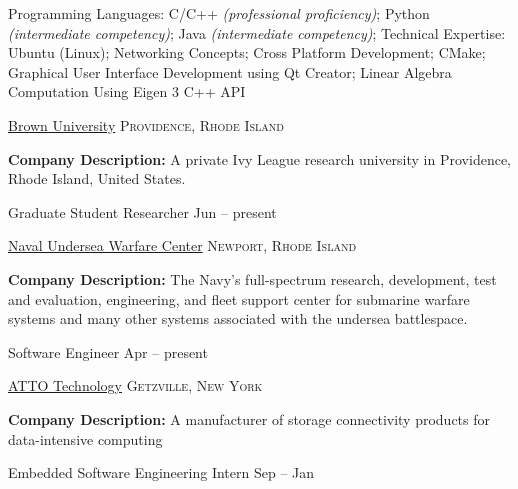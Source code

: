 \documentclass[12pt,a3paper]{article}
\begin{document}
\spacedhrule{0.5em}{-0.4em}


\inlineheadsection
  {Programming Languages:}
  { C/C++  \emph{(professional proficiency)}; Python  \emph{(intermediate competency)}; Java \emph{(intermediate competency)};}
\inlineheadsection
  {Technical Expertise:}
  {Ubuntu (Linux); Networking Concepts; Cross Platform Development; CMake; Graphical User Interface Development using Qt Creator; Linear Algebra Computation Using Eigen 3 C++ API}

\spacedhrule{1.6em}{-0.4em}


\headedsection  %
  {\href{http://robotics.cs.brown.edu/}{Brown University}}
  {\textsc{Providence, Rhode Island}} {
  
  {\textbf{Company Description:} A private Ivy League research university in Providence, Rhode Island, United States.}
  
  \headedsubsection
    {Graduate Student Researcher}
    {Jun  -- present}
    {}
}

\headedsection  %
  {\href{http://www.navsea.navy.mil/Home/Warfare-Centers/NUWC-Newport/}{Naval Undersea Warfare Center}}
  {\textsc{Newport, Rhode Island}} { 
  
  {\textbf{Company Description:} The Navy's full-spectrum research, development, test and evaluation, engineering, and fleet support center for submarine warfare systems and many other systems associated with the undersea battlespace.}
  
  \headedsubsection
    {Software Engineer}
    {Apr  -- present}
    {}
}

\headedsection  %
  {\href{https://www.atto.com/products/}{ATTO Technology}}
  {\textsc{Getzville, New York}} {
  
  {\textbf{Company Description:} A manufacturer of storage connectivity products for data-intensive computing}
  
  \headedsubsection
    {Embedded Software Engineering Intern}
    {Sep  -- Jan }
    {}
}
\end{document}
